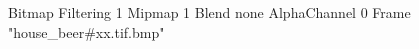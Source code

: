 {Bitmap
	{Filtering 1}
	{Mipmap 1}
	{Blend none}
	{AlphaChannel 0}
	{Frame "house_beer#xx.tif.bmp"}
}
